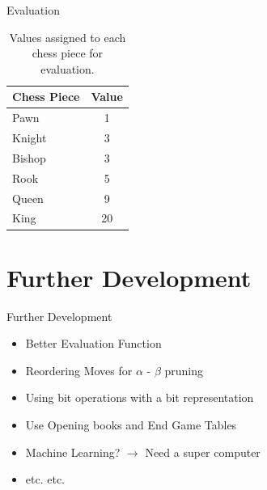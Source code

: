 \documentclass{beamer}
\begin{document}
\begin{frame}{Evaluation}
\begin{table}[ht]
\centering
\begin{tabular}{|l|c|}
\hline
\textbf{Chess Piece} & \textbf{Value} \\
\hline
Pawn & 1 \\
\hline
Knight & 3 \\
\hline
Bishop & 3 \\
\hline
Rook & 5 \\
\hline
Queen & 9 \\
\hline
King & 20 \\
\hline
\end{tabular}
\caption{Values assigned to each chess piece for evaluation.}
\label{table:chess_piece_values}
\end{table}
\end{frame}

%

\section{Further Development}

\begin{frame}{Further Development}
  \begin{itemize}
    \item Better Evaluation Function
    \item Reordering Moves for $\alpha$ - $\beta$ pruning
    \item Using bit operations with a bit representation
    \item Use Opening books and End Game Tables
    \item Machine Learning? $\rightarrow$ Need a super computer
    \item etc. etc.
  \end{itemize}
\end{frame}
\end{document}
